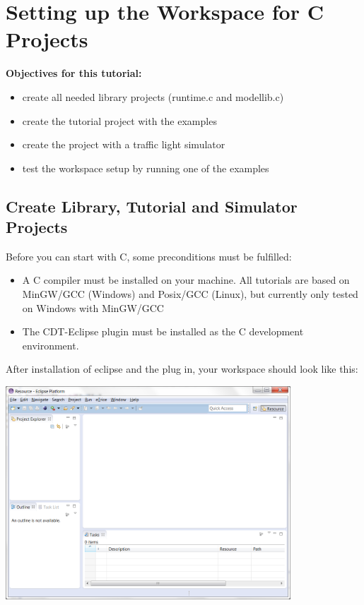 \section{Setting up the Workspace for C Projects}

\textbf{Objectives for this tutorial:}
\begin{itemize}
	\item create all needed library projects (runtime.c and modellib.c)
	\item create the tutorial project with the examples
	\item create the project with a traffic light simulator
	\item test the workspace setup by running one of the examples
\end{itemize}

\subsection{Create Library, Tutorial and Simulator Projects}

Before you can start with C, some preconditions must be fulfilled:

\begin{itemize}
\item A C compiler must be installed on your machine. All tutorials are based on MinGW/GCC (Windows) and Posix/GCC (Linux), but currently only tested on Windows with MinGW/GCC
\item The CDT-Eclipse plugin must be installed as the C development environment.
\end{itemize}

After installation of eclipse and the \eTrice{} plug in, your workspace should look like this:  

\includegraphics[width=0.8\textwidth]{images/013-SetupWorkspace01.png}

